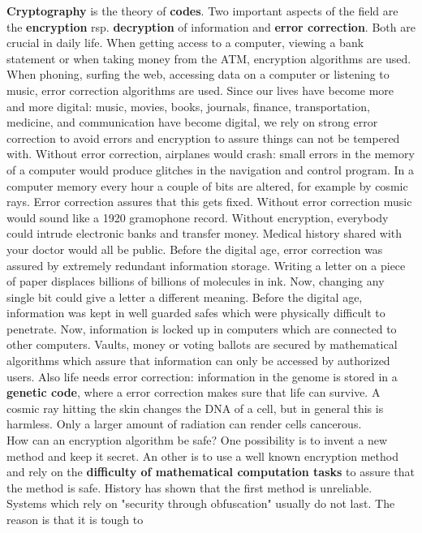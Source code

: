 \documentclass[12pt]{amsart}
\newcounter{example}    \def\example#1{ \item \fontsize{12}{15} \selectfont #1 \fontsize{12}{15} \selectfont }
\begin{document}
{\bf Cryptography} is the theory of {\bf codes}. Two important aspects of the field are 
the {\bf encryption} rsp. {\bf decryption} of information and {\bf error correction}. Both are crucial 
in daily life. When getting access to a computer, viewing a bank statement or when taking money from the 
ATM, encryption algorithms are used. When phoning, surfing the web, accessing data 
on a computer or listening to music, error correction algorithms are used. 
Since our lives have become more and more digital: music, movies, books, journals, 
finance, transportation, medicine, and communication have become digital, we rely on strong 
error correction to avoid errors and encryption to assure things can not be tempered
with. Without error correction, airplanes would crash: small errors in 
the memory of a computer would produce glitches in the navigation and control program. 
In a computer memory every hour a couple of bits are altered, for example by cosmic rays. Error 
correction assures that this gets fixed. Without error correction music would sound like a 1920 gramophone record.
Without encryption, everybody could intrude electronic banks and transfer money. 
Medical history shared with your doctor would all be public. 
Before the digital age, error correction was assured by extremely redundant information storage. 
Writing a letter on a piece of paper displaces billions of billions of molecules in ink.
Now, changing any single bit could give a letter a different meaning. 
Before the digital age, information was kept in well guarded safes which were 
physically difficult to penetrate. Now, information is locked up in computers which are 
connected to other computers. Vaults, money or voting ballots are secured by mathematical algorithms 
which assure that information can only be accessed by authorized users. 
Also life needs error correction: information in the genome is stored in a 
{\bf genetic code}, where a error correction makes sure that life can survive. 
A cosmic ray hitting the skin changes the DNA of a cell, but in general this is harmless.
Only a larger amount of radiation can render cells cancerous. \\
How can an encryption algorithm be safe? One possibility is to invent a new
method and keep it secret. An other is to use a well known encryption method 
and rely on the {\bf difficulty of mathematical computation tasks} to assure that the method is safe.
History has shown that the first method is unreliable. Systems which rely on "security through 
obfuscation" usually do not last. The reason is that it is tough to 
\end{document}
